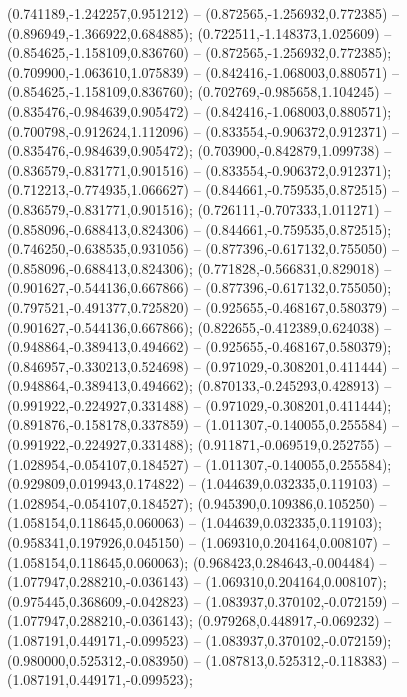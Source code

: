  (0.741189,-1.242257,0.951212) -- (0.872565,-1.256932,0.772385) -- (0.896949,-1.366922,0.684885);
 (0.722511,-1.148373,1.025609) -- (0.854625,-1.158109,0.836760) -- (0.872565,-1.256932,0.772385);
 (0.709900,-1.063610,1.075839) -- (0.842416,-1.068003,0.880571) -- (0.854625,-1.158109,0.836760);
 (0.702769,-0.985658,1.104245) -- (0.835476,-0.984639,0.905472) -- (0.842416,-1.068003,0.880571);
 (0.700798,-0.912624,1.112096) -- (0.833554,-0.906372,0.912371) -- (0.835476,-0.984639,0.905472);
 (0.703900,-0.842879,1.099738) -- (0.836579,-0.831771,0.901516) -- (0.833554,-0.906372,0.912371);
 (0.712213,-0.774935,1.066627) -- (0.844661,-0.759535,0.872515) -- (0.836579,-0.831771,0.901516);
 (0.726111,-0.707333,1.011271) -- (0.858096,-0.688413,0.824306) -- (0.844661,-0.759535,0.872515);
 (0.746250,-0.638535,0.931056) -- (0.877396,-0.617132,0.755050) -- (0.858096,-0.688413,0.824306);
 (0.771828,-0.566831,0.829018) -- (0.901627,-0.544136,0.667866) -- (0.877396,-0.617132,0.755050);
 (0.797521,-0.491377,0.725820) -- (0.925655,-0.468167,0.580379) -- (0.901627,-0.544136,0.667866);
 (0.822655,-0.412389,0.624038) -- (0.948864,-0.389413,0.494662) -- (0.925655,-0.468167,0.580379);
 (0.846957,-0.330213,0.524698) -- (0.971029,-0.308201,0.411444) -- (0.948864,-0.389413,0.494662);
 (0.870133,-0.245293,0.428913) -- (0.991922,-0.224927,0.331488) -- (0.971029,-0.308201,0.411444);
 (0.891876,-0.158178,0.337859) -- (1.011307,-0.140055,0.255584) -- (0.991922,-0.224927,0.331488);
 (0.911871,-0.069519,0.252755) -- (1.028954,-0.054107,0.184527) -- (1.011307,-0.140055,0.255584);
 (0.929809,0.019943,0.174822) -- (1.044639,0.032335,0.119103) -- (1.028954,-0.054107,0.184527);
 (0.945390,0.109386,0.105250) -- (1.058154,0.118645,0.060063) -- (1.044639,0.032335,0.119103);
 (0.958341,0.197926,0.045150) -- (1.069310,0.204164,0.008107) -- (1.058154,0.118645,0.060063);
 (0.968423,0.284643,-0.004484) -- (1.077947,0.288210,-0.036143) -- (1.069310,0.204164,0.008107);
 (0.975445,0.368609,-0.042823) -- (1.083937,0.370102,-0.072159) -- (1.077947,0.288210,-0.036143);
 (0.979268,0.448917,-0.069232) -- (1.087191,0.449171,-0.099523) -- (1.083937,0.370102,-0.072159);
 (0.980000,0.525312,-0.083950) -- (1.087813,0.525312,-0.118383) -- (1.087191,0.449171,-0.099523);
